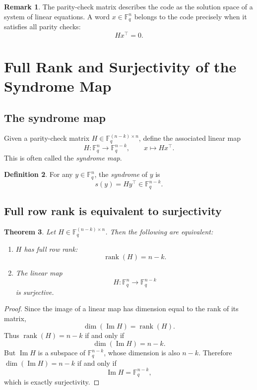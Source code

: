 \documentclass[11pt]{article}
\newcommand{\F}{\mathbb{F}}
\newcommand{\rank}{\operatorname{rank}}
\newcommand{\im}{\operatorname{Im}}
\theoremstyle{definition}
\newtheorem{definition}{Definition}[section]
\newtheorem{remark}[definition]{Remark}
\theoremstyle{plain}
\newtheorem{theorem}[definition]{Theorem}
\begin{document}
	\begin{remark}
		The parity-check matrix describes the code as the solution space of a system of linear equations. A word \(x\in \F_q^n\) belongs to the code precisely when it satisfies all parity checks:
		\[
		Hx^\top = 0.
		\]
	\end{remark}
	
	\section{Full Rank and Surjectivity of the Syndrome Map}
	
	\subsection{The syndrome map}
	
	Given a parity-check matrix \(H\in \F_q^{(n-k)\times n}\), define the associated linear map
	\[
	H:\F_q^n\to \F_q^{n-k}, \qquad x\mapsto Hx^\top.
	\]
	This is often called the \emph{syndrome map}.
	
	\begin{definition}
		For any \(y\in \F_q^n\), the \emph{syndrome} of \(y\) is
		\[
		s(y)=Hy^\top \in \F_q^{n-k}.
		\]
	\end{definition}
	
	\subsection{Full row rank is equivalent to surjectivity}
	
	\begin{theorem}
		Let \(H\in \F_q^{(n-k)\times n}\). Then the following are equivalent:
		\begin{enumerate}[label=\textnormal{(\arabic*)}, leftmargin=2.5em]
			\item \(H\) has full row rank:
			\[
			\rank(H)=n-k.
			\]
			\item The linear map
			\[
			H:\F_q^n\to \F_q^{n-k}
			\]
			is surjective.
		\end{enumerate}
	\end{theorem}
	
	\begin{proof}
		Since the image of a linear map has dimension equal to the rank of its matrix,
		\[
		\dim(\im H)=\rank(H).
		\]
		Thus \(\rank(H)=n-k\) if and only if
		\[
		\dim(\im H)=n-k.
		\]
		But \(\im H\) is a subspace of \(\F_q^{n-k}\), whose dimension is also \(n-k\). Therefore \(\dim(\im H)=n-k\) if and only if
		\[
		\im H=\F_q^{n-k},
		\]
		which is exactly surjectivity.
	\end{proof}
	
\end{document}
